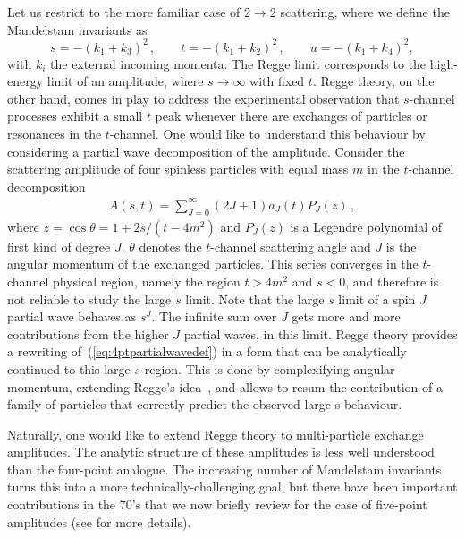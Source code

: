 Let us restrict to the more familiar case of $2 \to 2$ scattering, where we define  the Mandelstam invariants as
\begin{equation}
  \label{eq:mandelstamst}
  s= - ( k_1+k_3)^2\,,\qquad t=-(k_1+k_2)^2\,,\qquad u=-(k_1+k_4)^2,
\end{equation}
with  $k_i$ the external incoming momenta.
The Regge limit corresponds to the high-energy limit of an amplitude, where $s\to \infty$ with fixed $t$.
Regge theory, on the other hand, comes in play to address the experimental observation that $s$-channel
processes exhibit a small $t$ peak whenever there are exchanges of particles or resonances in the $t$-channel.
One would like to understand this behaviour by considering a partial wave decomposition of the amplitude.
Consider the scattering amplitude of four spinless particles with equal mass $m$ in the $t$-channel decomposition 
\begin{align}
  \label{eq:4ptpartialwavedef}
  A(s,t)=\sum_{J=0}^{\infty} (2J+1) a_{J}(t) P_{J}(z)\,,
\end{align}
where $z=\cos \theta=1+ 2s/(t-4m^2)$ and
$P_J(z)$ is a Legendre polynomial of first kind of degree $J$. $\theta$ denotes the $t$-channel scattering angle and $J$ is the angular momentum of the exchanged particles.
This series converges in the $t$-channel physical region, namely the region $t>4m^2$ and $s<0$, and therefore is not reliable to study the large $s$ limit.
Note that the large $s$ limit of a spin $J$ partial wave behaves as $ s^{J} $.
The infinite sum over $ J $ gets more and more contributions from the higher $ J $ partial waves, in this limit.
Regge theory provides a rewriting of~(\ref{eq:4ptpartialwavedef}) in a form that can be analytically continued to this large $s$ region.
This is done by complexifying angular momentum, extending Regge's idea~\cite{Regge:1959mz}, and allows to resum the contribution of a family of
particles that correctly predict the observed large s behaviour. 

Naturally, one would like to extend Regge theory to multi-particle exchange amplitudes. The analytic structure of these amplitudes is less well understood than the four-point analogue.
The increasing number of Mandelstam invariants turns this into a more technically-challenging goal, but there have been important contributions in the 70's that we now briefly review
for the case of five-point amplitudes (see \cite{Goddard:1971fq, White:1972sc,White:1972rq,White:1973ola,White:1976qm,Brower:1974yv,Weis:1972tbu,Abarbanel:1972ayr,Stapp:1982mq,PhysRev.176.2003, NotesOnMultiRegge} for more details).

